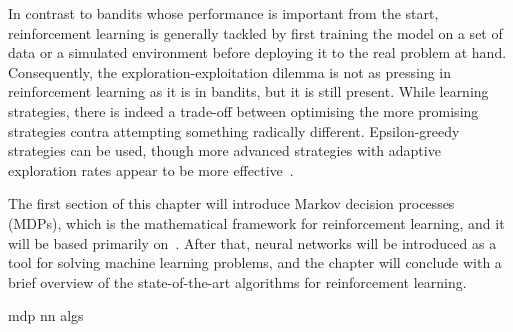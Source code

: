 In contrast to bandits whose performance is important from the start, reinforcement learning is generally tackled by first training the model on a set of data or a simulated environment before deploying it to the real problem at hand.
Consequently, the exploration-exploitation dilemma is not as pressing in reinforcement learning as it is in bandits, but it is still present.
While learning strategies, there is indeed a trade-off between optimising the more promising strategies contra attempting something radically different.
Epsilon-greedy strategies can be used, though more advanced strategies with adaptive exploration rates appear to be more effective~\autocite{tokic2011}.

The first section of this chapter will introduce Markov decision processes (MDPs), which is the mathematical framework for reinforcement learning, and it will be based primarily on~\autocite{lattimore2020,sutton2018}.
After that, neural networks will be introduced as a tool for solving machine learning problems, and the chapter will conclude with a brief overview of the state-of-the-art algorithms for reinforcement learning.


{mdp}
{nn}
{algs}